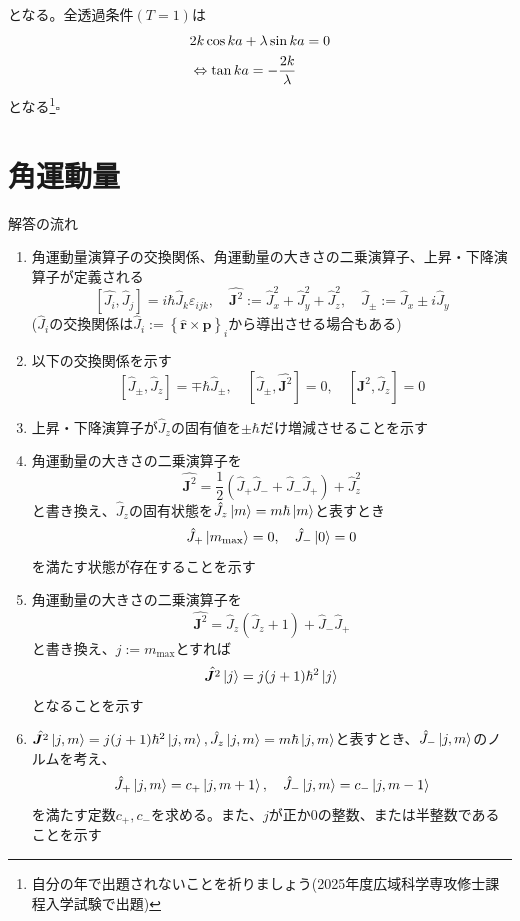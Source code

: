 \documentclass{jsarticle}  %
\numberwithin{equation}{section} %
\numberwithin{figure}{section}
\begin{document}
    となる。全透過条件$(T=1)$は
    \begin{align}
        &2k \cos ka + \lambda \sin ka = 0\notag \\
        &\Leftrightarrow \tan ka = -\frac{2k}{\lambda}
    \end{align}
    となる\footnote{自分の年で出題されないことを祈りましょう(2025年度広域科学専攻修士課程入学試験で出題)}$\square$
\section{角運動量}
    \begin{itembox}[l]{\large{解答の流れ}}
        \begin{enumerate}
            \item 角運動量演算子の交換関係、角運動量の大きさの二乗演算子、上昇・下降演算子が定義される
            \[ [\hat{J_i},\hat{J}_j] = i\hbar \hat{J}_k \varepsilon_{ijk},\quad \hat{\bm{J}^2} := \hat{J}_x^2 + \hat{J}_y^2 + \hat{J}_z^2,\quad \hat{J}_{\pm} := \hat{J}_x \pm i\hat{J}_y \]
            ($\hat{J}_i$の交換関係は$\hat{J}_i := \left\{ \hat{\bm{r}}\times\hat{\bm{p}} \right\}_i $から導出させる場合もある)
            \item 以下の交換関係を示す
            \[ [\hat{J}_{\pm},\hat{J}_z] = \mp \hbar \hat{J}_{\pm},\quad [\hat{J}_{\pm}, \hat{\bm{J}^2}] = 0,\quad [\hat{\bm{J}^2},\hat{J}_z]=0 \]
            \item 上昇・下降演算子が$\hat{J}_z$の固有値を$\pm \hbar$だけ増減させることを示す
            \item 角運動量の大きさの二乗演算子を
            \[ \hat{\bm{J}^2} = \frac{1}{2}\left( \hat{J}_+\hat{J}_- + \hat{J}_-\hat{J}_+ \right) + \hat{J}_z^2\]
            と書き換え、$\hat{J}_z$の固有状態を$\hat{J}_z\ket{m} = m\hbar\ket{m}$と表すとき
            \[ \hat{J}_+ \ket{m_{\max}} =0,\quad \hat{J}_{-} \ket{0} = 0 \]
            を満たす状態が存在することを示す
            \item 角運動量の大きさの二乗演算子を
            \[ \hat{\bm{J}^2} = \hat{J}_z(\hat{J}_z + 1) + \hat{J}_- \hat{J}_+\]
            と書き換え、$j := m_{\max}$とすれば
            \[ \hat{\bm{J}^2} \ket{j} = j(j+1)\hbar^2\ket{j} \]
            となることを示す
            \item $\hat{\bm{J}^2} \ket{j,m} = j(j+1)\hbar^2\ket{j,m}, \hat{J}_z \ket{j,m} = m\hbar \ket{j,m}$と表すとき、$\hat{J}_- \ket{j,m}$のノルムを考え、
            \[ \hat{J}_+ \ket{j,m} = c_+ \ket{j,m+1},\quad \hat{J}_- \ket{j,m} = c_- \ket{j,m-1} \]
            を満たす定数$c_+,c_-$を求める。また、$j$が正か0の整数、または半整数であることを示す
        \end{enumerate}
    \end{itembox}
\end{document}
